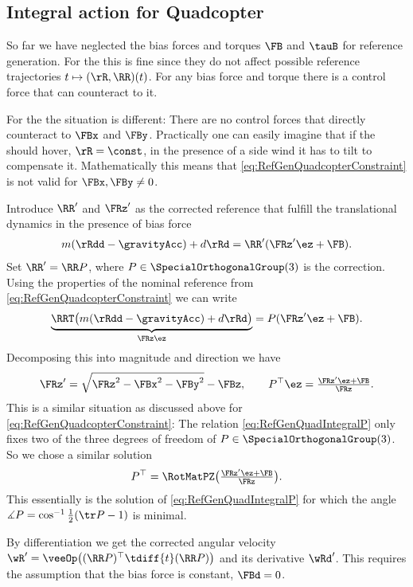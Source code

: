\subsection{Integral action for Quadcopter}
So far we have neglected the bias forces and torques $\FB$ and $\tauB$ for reference generation.
For the \Tricopter this is fine since they do not affect possible reference trajectories $t \mapsto (\rR, \RR)(t)$.
For any bias force and torque there is a control force that can counteract to it.

For the \Quadcopter the situation is different:
There are no control forces that directly counteract to $\FBx$ and $\FBy$.
Practically one can easily imagine that if the \Quadcopter should hover, $\rR=\const$, in the presence of a side wind it has to tilt to compensate it.
Mathematically this means that \eqref{eq:RefGenQuadcopterConstraint} is not valid for $\FBx, \FBy \neq 0$.

Introduce $\RR'$ and $\FRz'$ as the corrected reference that fulfill the translational dynamics in the presence of bias force
\begin{align}
 m(\rRdd-\gravityAcc) + d \rRd = \RR' (\FRz' \ez + \FB).
\end{align}
Set $\RR' = \RR P$, where $P\in \SpecialOrthogonalGroup(3)$ is the correction.
Using the properties of the nominal reference from \eqref{eq:RefGenQuadcopterConstraint} we can write
\begin{align}
 \underbrace{\RRT \big( m(\rRdd-\gravityAcc) + d \rRd \big)}_{\FRz \ez} = P (\FRz' \ez + \FB).
\end{align}
Decomposing this into magnitude and direction we have
\begin{align}\label{eq:RefGenQuadIntegralP}
 \FRz' = \sqrt{\FRz^2 - \FBx^2 - \FBy^2} - \FBz,
\qquad
 P^\top \ez = \tfrac{\FRz' \ez + \FB}{\FRz}.
\end{align}
This is a similar situation as discussed above for \eqref{eq:RefGenQuadcopterConstraint}: The relation \eqref{eq:RefGenQuadIntegralP} only fixes two of the three degrees of freedom of $P\in\SpecialOrthogonalGroup(3)$.
So we chose a similar solution
\begin{align}
 P^\top = \RotMatPZ\big( \tfrac{\FRz' \ez + \FB}{\FRz} \big).
\end{align}
This essentially is the solution of \eqref{eq:RefGenQuadIntegralP} for which the angle $\measuredangle P = \cos^{-1} \tfrac{1}{2}(\tr P - 1)$ is minimal.

By differentiation we get the corrected angular velocity $\wR' = \veeOp\big( (\RR P)^\top \tdiff{t}(\RR P)\big)$ and its derivative $\wRd'$.
This requires the assumption that the bias force is constant, $\FBd = 0$.

